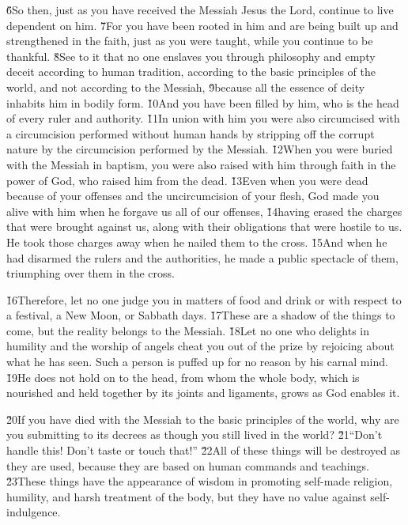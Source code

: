 \v{6}So then, just as you have received the Messiah Jesus the Lord, continue to live dependent on him. \v{7}For you have been rooted in him and are being built up and strengthened in the faith, just as you were taught, while you continue to be thankful. \v{8}See to it that no one enslaves you through philosophy and empty deceit according to human tradition, according to the basic principles of the world, and not according to the Messiah, \v{9}because all the essence of deity inhabits him in bodily form. \v{10}And you have been filled by him, who is the head of every ruler and authority. \v{11}In union with him you were also circumcised with a circumcision performed without human hands by stripping off the corrupt nature by the circumcision performed by the Messiah. \v{12}When you were buried with the Messiah in baptism, you were also raised with him through faith in the power of God, who raised him from the dead. \v{13}Even when you were dead because of your offenses and the uncircumcision of your flesh, God made you alive with him when he forgave us all of our offenses, \v{14}having erased the charges that were brought against us, along with their obligations that were hostile to us. He took those charges away when he nailed them to the cross. \v{15}And when he had disarmed the rulers and the authorities, he made a public spectacle of them, triumphing over them in the cross.

\v{16}Therefore, let no one judge you in matters of food and drink or with respect to a festival, a New Moon, or Sabbath days. \v{17}These are a shadow of the things to come, but the reality belongs to the Messiah. \v{18}Let no one who delights in humility and the worship of angels cheat you out of the prize by rejoicing about what he has seen. Such a person is puffed up for no reason by his carnal mind. \v{19}He does not hold on to the head, from whom the whole body, which is nourished and held together by its joints and ligaments, grows as God enables it.

\v{20}If you have died with the Messiah to the basic principles of the world, why are you submitting to its decrees as though you still lived in the world? \v{21}``Don't handle this! Don't taste or touch that!'' \v{22}All of these things will be destroyed as they are used, because they are based on human commands and teachings. \v{23}These things have the appearance of wisdom in promoting self-made religion, humility, and harsh treatment of the body, but they have no value against self-indulgence.


